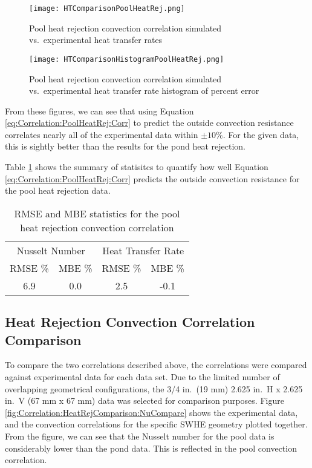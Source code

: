 \begin{figure}
	\centering
	\texttt{[image: HTComparisonPoolHeatRej.png]}
	\caption{Pool heat rejection convection correlation simulated vs.\ experimental heat transfer rates}
	\label{fig:Correlation:PoolHeatRej:HTComparison}
\end{figure}


\begin{figure}
	\centering
	\texttt{[image: HTComparisonHistogramPoolHeatRej.png]}
	\caption{Pool heat rejection convection correlation simulated vs.\ experimental heat transfer rate histogram of percent error}
	\label{fig:Correlation:PoolHeatRej:HTComparisonHistogram}
\end{figure}	

From these figures, we can see that using Equation \ref{eq:Correlation:PoolHeatRej:Corr} to predict the outside convection resistance correlates nearly all of the experimental data within $\pm10\%$. For the given data, this is sightly better than the results for the pond heat rejection.


Table \ref{tab:Correlation:PoolHeatRej:StatSummaryTable} shows the summary of statisitcs to quantify how well Equation \ref{eq:Correlation:PoolHeatRej:Corr} predicts the outside convection resistance for the pool heat rejection data.	

	\begin{table}[h]
		\centering
		\caption{RMSE and MBE statistics for the pool heat rejection convection correlation}
		\label{tab:Correlation:PoolHeatRej:StatSummaryTable}
		\begin{tabular}{c c c c}
		\hline
		\multicolumn{2}{c}{Nusselt Number} & \multicolumn{2}{c}{Heat Transfer Rate} \\
		RMSE \% & MBE \% & RMSE \% & MBE \% \\
		\hline\hline
		6.9 & 0.0 & 2.5 & -0.1 \\
		\hline		
		\end{tabular}
	\end{table}	


\subsection{Heat Rejection Convection Correlation Comparison}
\label{subsec:Correlation:HeatRejComparison}

To compare the two correlations described above, the correlations were compared against experimental data for each data set. Due to the limited number of overlapping geometrical configurations, the 3/4 in.\ (19 mm) 2.625 in.\ H x 2.625 in.\ V (67 mm x 67 mm) data was selected for comparison purposes. Figure \ref{fig:Correlation:HeatRejComparison:NuCompare} shows the experimental data, and the convection correlations for the specific SWHE geometry plotted together. From the figure, we can see that the Nusselt number for the pool data is considerably lower than the pond data. This is reflected in the pool convection correlation.

